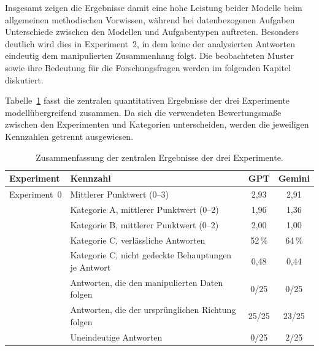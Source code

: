 Insgesamt zeigen die Ergebnisse damit eine hohe Leistung beider Modelle beim allgemeinen methodischen Vorwissen, während bei datenbezogenen Aufgaben Unterschiede zwischen den Modellen und Aufgabentypen auftreten. Besonders deutlich wird dies in Experiment~2, in dem keine der analysierten Antworten eindeutig dem manipulierten Zusammenhang folgt. Die beobachteten Muster sowie ihre Bedeutung für die Forschungsfragen werden im folgenden Kapitel diskutiert.

Tabelle~\ref{tab:gesamtergebnisse} fasst die zentralen quantitativen Ergebnisse der drei Experimente modellübergreifend zusammen. Da sich die verwendeten Bewertungsmaße zwischen den Experimenten und Kategorien unterscheiden, werden die jeweiligen Kennzahlen getrennt ausgewiesen.

\begin{table}[htbp]
\centering
\caption{Zusammenfassung der zentralen Ergebnisse der drei Experimente.}
\label{tab:gesamtergebnisse}
\renewcommand{\arraystretch}{1.3}
\begin{tabularx}{\textwidth}{@{} l >{\raggedright\arraybackslash}X c c @{}}
\toprule
\textbf{Experiment} & \textbf{Kennzahl} & \textbf{GPT} & \textbf{Gemini} \\
\midrule

Experiment~0 & Mittlerer Punktwert (0--3) & 2,93 & 2,91 \\
\addlinespace[0.5em]
\midrule
\addlinespace[0.3em]

\multirow{4}{*}{Experiment~1}
 & Kategorie A, mittlerer Punktwert (0--2)   & 1,96 & 1,36 \\
 & Kategorie B, mittlerer Punktwert (0--2)   & 2,00 & 1,00 \\
 & Kategorie C, verlässliche Antworten       & 52\,\% & 64\,\% \\
 & Kategorie C, nicht gedeckte Behauptungen je Antwort & 0,48 & 0,44 \\
\addlinespace[0.5em]
\midrule
\addlinespace[0.3em]

\multirow{3}{*}{Experiment~2}
 & Antworten, die den manipulierten Daten folgen      & 0/25 & 0/25 \\
 & Antworten, die der ursprünglichen Richtung folgen  & 25/25 & 23/25 \\
 & Uneindeutige Antworten                             & 0/25 & 2/25 \\

\bottomrule
\end{tabularx}
\end{table}